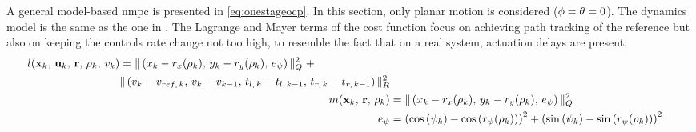 A general model-based \acrshort{nmpc} is presented in \ref{eq:onestageocp}. In this section, only planar motion is considered ($\phi = \theta = 0$). The dynamics model is the same as the one in . The Lagrange and Mayer terms of the cost function focus on achieving path tracking of the reference but also on keeping the controls rate change not too high, to resemble the fact that on a real system, actuation delays are present.
\begin{subequations}
	\begin{align}
		\begin{split}
			l(\mathbf{x}_k,\,\mathbf{u}_k,\,\mathbf{r},\,\rho_k,\,v_k) &= \Vert\left(x_k - r_{x}(\rho_k),\,y_k - r_{y}(\rho_k),\,e_{\psi}\right)\Vert_Q^2 \; +\\ &\Vert\left(v_k - v_{ref,\,k},\, v_k - v_{k-1},\,t_{l,\,k} - t_{l,\,k-1},\,t_{r,\,k} - t_{r,\,k-1}\right)\Vert_R^2 \label{subeq:onestagelagrange} \\
		\end{split}\\
		m(\mathbf{x}_k,\,\mathbf{r},\,\rho_k) &= \Vert\left(x_k - r_{x}(\rho_k),\,y_k - r_{y}(\rho_k),\,e_{\psi}\right)\Vert_Q^2 \label{subeq:onestagemayer} \\
		e_{\psi} &= \left(\cos\left(\psi_k\right) - \cos\left(r_{\psi}(\rho_k)\right)\right)^2 + \left(\sin\left(\psi_k\right) - \sin\left(r_{\psi}(\rho_k)\right)\right)^2 \label{subeq:rotationInvtrick}
	\end{align}
\end{subequations}

